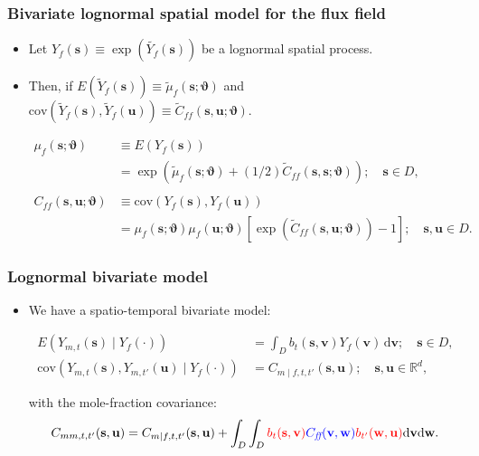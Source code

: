 \documentclass{beamer}
\newcommand{\svec} {\textbf{s}}
\newcommand{\uvec} {\textbf{u}}
\newcommand{\s}{\mathbf{s}}
\renewcommand{\v}{\mathbf{v}}
\renewcommand{\u}{\mathbf{u}}
\newcommand{\w}{\mathbf{w}}
\renewcommand{\d}{\mathrm{d}}
\newcommand{\E}{E}
\newcommand{\cov}{\mathrm{cov}}
\newcommand{\varthetab} {{\boldsymbol{\vartheta}}}
\newcommand{\ff} {\textit{ff}}
\newcommand{\red}{\textcolor{red}}%
\newcommand{\blue}{\textcolor{blue}}
\begin{document}
\begin{frame}
\frametitle{Bivariate lognormal spatial model for the flux field}

\begin{itemize}
\item Let $Y_f(\svec) \equiv \exp(\widetilde{Y_f}(\svec))$ be a lognormal spatial process.\vfill \pause
\item Then, if $\E(\widetilde{Y}_f(\s)) \equiv \widetilde\mu_f(\s;\varthetab)$ and $\cov(\widetilde{Y}_f(\s),\widetilde{Y}_f(\u)) \equiv \widetilde{C}_{\ff}(\s,\u; \varthetab)$.


\begin{align*}
\mu_f(\s;\varthetab) &\equiv \E(Y_f(\s)) \\ &=  \exp(\widetilde{\mu}_f(\svec;\varthetab) + (1/2)\widetilde{C}_{\ff}(\s,\s;\varthetab)); \quad \svec \in D,\\
&\\
 C_{\ff}(\s,\u;\varthetab) &\equiv \cov(Y_f(\s),Y_f(\u))
\\&= \mu_f(\s;\varthetab)\mu_f(\u;\varthetab)[\exp(\widetilde{C}_{\ff}(\s,\u;\varthetab)) - 1] ; \quad \svec,\uvec \in D.
\end{align*} \vfill
\end{itemize}

\end{frame}


\begin{frame}
\frametitle{Lognormal bivariate model}

\begin{itemize}

\item We have a spatio-temporal bivariate model:

\begin{align*}
\E\left(Y_{m,t}(\s)\mid Y_f(\cdot)\right)&\,=\int_D{b_t(\s,\v)Y_f(\v)\,\d \v};\quad \s\in D,\\
\cov\left(Y_{m,t}(\s),Y_{m,t'}(\u)\mid Y_f(\cdot)\right)&\,=C_{m\mid f,t,t'}(\s,\u);\quad \s,\u\in \mathbb{R}^d,
\end{align*}

\pause with the mole-fraction covariance:
\begin{equation*}
C_{mm,t,t'}(\s,\u) = C_{m\mid f,t,t'}(\s,\u)+\int_D\int_D {\red{b_t(\s,\v)}} \blue{C_{\ff}(\v,\w)} \red{b_{t'}(\w,\u)}\d\v\d\w.
\end{equation*}


\end{itemize}

\end{frame}
\end{document}

